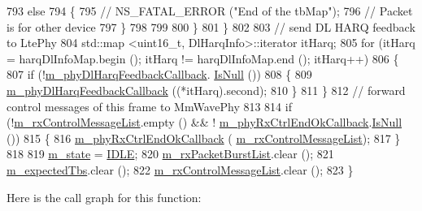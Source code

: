 \begin{DoxyCode}
793                         \textcolor{keywordflow}{else}
794                         \{
795                                 \textcolor{comment}{//                              NS\_FATAL\_ERROR ("End of the tbMap");}
796                                 \textcolor{comment}{// Packet is for other device}
797                         \}
798 
799 
800                 \}
801         \}
802 
803         \textcolor{comment}{// send DL HARQ feedback to LtePhy}
804         std::map <uint16\_t, DlHarqInfo>::iterator itHarq;
805         \textcolor{keywordflow}{for} (itHarq = harqDlInfoMap.begin (); itHarq != harqDlInfoMap.end (); itHarq++)
806         \{
807                 \textcolor{keywordflow}{if} (!\hyperlink{classns3_1_1MmWaveSpectrumPhy_a59802a12b19c0edc5e05fb84af294221}{m\_phyDlHarqFeedbackCallback}.
      \hyperlink{classns3_1_1Callback_aa8e27826badbf37f84763f36f70d9b54}{IsNull} ())
808                 \{
809                         \hyperlink{classns3_1_1MmWaveSpectrumPhy_a59802a12b19c0edc5e05fb84af294221}{m\_phyDlHarqFeedbackCallback} ((*itHarq).second);
810                 \}
811         \}
812         \textcolor{comment}{// forward control messages of this frame to MmWavePhy}
813 
814         \textcolor{keywordflow}{if} (!\hyperlink{classns3_1_1MmWaveSpectrumPhy_a664d37bae64e42733ffbc3b225104ebd}{m\_rxControlMessageList}.empty () && !
      \hyperlink{classns3_1_1MmWaveSpectrumPhy_a6bc6850143640be8a288b87a94bfbfa2}{m\_phyRxCtrlEndOkCallback}.\hyperlink{classns3_1_1Callback_aa8e27826badbf37f84763f36f70d9b54}{IsNull} ())
815         \{
816                 \hyperlink{classns3_1_1MmWaveSpectrumPhy_a6bc6850143640be8a288b87a94bfbfa2}{m\_phyRxCtrlEndOkCallback} (
      \hyperlink{classns3_1_1MmWaveSpectrumPhy_a664d37bae64e42733ffbc3b225104ebd}{m\_rxControlMessageList});
817         \}
818 
819         \hyperlink{classns3_1_1MmWaveSpectrumPhy_ab6330aa9de7700e7e15b82000335665d}{m\_state} = \hyperlink{classns3_1_1MmWaveSpectrumPhy_a665335f60416cf031a9b68209e4368aeadae9004ebbfa9610354cf62b76eed607}{IDLE};
820         \hyperlink{classns3_1_1MmWaveSpectrumPhy_ab57ce6deb73d1e7032276863528fa320}{m\_rxPacketBurstList}.clear ();
821         \hyperlink{classns3_1_1MmWaveSpectrumPhy_a596e02208ad8258c0bbc41bb26df7d6c}{m\_expectedTbs}.clear ();
822         \hyperlink{classns3_1_1MmWaveSpectrumPhy_a664d37bae64e42733ffbc3b225104ebd}{m\_rxControlMessageList}.clear ();
823 \}
\end{DoxyCode}


Here is the call graph for this function\+:




